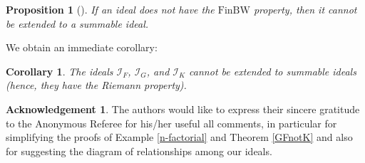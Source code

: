 \documentclass{amsart}
\newtheorem{prop}[thm]{Proposition}
\newtheorem{cor}[thm]{Corollary}
\theoremstyle{definition}
\newtheorem*{acknowledgement}{Acknowledgement}
\newcommand{\I}{\mathcal I}
\newcommand{\finbw}{\text{FinBW}}
\begin{document}
\begin{prop}[{\cite[Corollary 3.5]{H3}}]
If an ideal does not have the $\finbw$ property, then it cannot be extended to a summable ideal.
\end{prop}

We obtain an immediate corollary:
\begin{cor}
The ideals $\I_F$, $\I_G$, and $\I_K$ cannot be extended to summable ideals (hence, they have the Riemann property).
\end{cor}

\begin{acknowledgement}
The authors would like to express their sincere gratitude to the Anonymous Referee
for his/her useful all comments, in particular for 
simplifying the proofs of Example \ref{n-factorial} and 
Theorem \ref{GFnotK} and also for suggesting the diagram of 
relationships among our ideals.
\end{acknowledgement}
\end{document}
